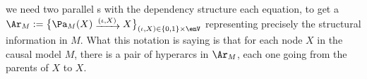 {we need two parallel \arc s with the dependency structure each equation, to get a \hgraph\ 
$
    \Ar_{M} := 
    \big\{
        \Pa_{M}(X) 
        \mathrel{\raisebox{-2pt}{$\xrightarrow{(\iota,X)}$}}
        X
    \big\}_{(\iota,X) \in \{0,1\} \times \enV}
$
representing precisely the structural information in $M$.  
What this notation is saying is that for each node $X$ in the causal
model $M$, there is a pair of hyperarcs in $\Ar_M$, each one going
from the parents of $X$ to $X$.

}
